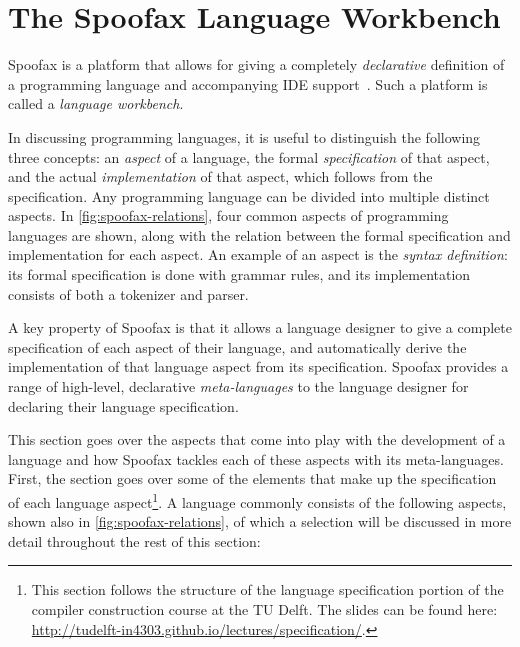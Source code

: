 \section{The Spoofax Language Workbench}
\label{sec:spoofax}

Spoofax is a platform that allows for giving a completely \emph{declarative}
definition of a programming language and accompanying IDE
support~\cite{Kats10a}. Such a platform is called a \emph{language workbench}.

In discussing programming languages, it is useful to distinguish the following
three concepts: an \textit{aspect} of a language, the formal
\textit{specification} of that aspect, and the actual \textit{implementation} of
that aspect, which follows from the specification. Any programming language can
be divided into multiple distinct aspects. In \cref{fig:spoofax-relations}, four
common aspects of programming languages are shown, along with the relation
between the formal specification and implementation for each aspect. An example
of an aspect is the \textit{syntax definition}: its formal specification is done
with grammar rules, and its implementation consists of both a tokenizer and
parser.

A key property of Spoofax is that it allows a language designer to give a
complete specification of each aspect of their language, and automatically
derive the implementation of that language aspect from its
specification. Spoofax provides a range of high-level, declarative
\textit{meta-languages} to the language designer for declaring their language
specification.

This section goes over the aspects that come into play with the development of a
language and how Spoofax tackles each of these aspects with its
meta-languages. First, the section goes over some of the elements that make up
the specification of each language aspect\footnote{This section follows the
  structure of the language specification portion of the compiler construction
  course at the TU Delft. The slides can be found here:
  \url{http://tudelft-in4303.github.io/lectures/specification/}.}. A language
commonly consists of the following aspects, shown also in
\cref{fig:spoofax-relations}, of which a selection will be discussed in more
detail throughout the rest of this section:

